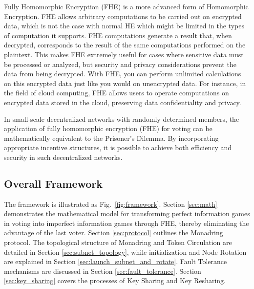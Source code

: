 \documentclass[11pt]{article}
\begin{document}
Fully Homomorphic Encryption (FHE) is a more advanced form of Homomorphic Encryption.
FHE allows arbitrary computations to be carried out on encrypted data, which is not the case with normal HE which might be limited in the types of computation it supports.
FHE computations generate a result that, when decrypted, corresponds to the result of the same computations performed on the plaintext.
This makes FHE extremely useful for cases where sensitive data must be processed or analyzed, but security and privacy considerations prevent the data from being decrypted.
With FHE, you can perform unlimited calculations on this encrypted data just like you would on unencrypted data. For instance, in the field of cloud computing, FHE allows users to operate computations on encrypted data stored in the cloud, preserving data confidentiality and privacy.

In small-scale decentralized networks with randomly determined members, the application of fully homomorphic encryption (FHE) for voting can be mathematically equivalent to the Prisoner's Dilemma. By incorporating appropriate incentive structures, it is possible to achieve both efficiency and security in such decentralized networks.
\subsection{Overall Framework}
The framework is illustrated as Fig.~\ref{fig:framework}.
Section \ref{sec:math} demonstrates the mathematical model for transforming perfect information games in voting into imperfect information games through FHE, thereby eliminating the advantage of the last voter. Section \ref{sec:protocol} outlines the Monadring protocol. The topological structure of Monadring and Token Circulation are detailed in Section \ref{sec:subnet_topology}, while initialization and Node Rotation are explained in Section \ref{sec:launch_subnet_and_rotate}. Fault Tolerance mechanisms are discussed in Section \ref{sec:fault_tolerance}.  Section \ref{sec:key_sharing} covers the processes of Key Sharing and Key Resharing.
\end{document}
